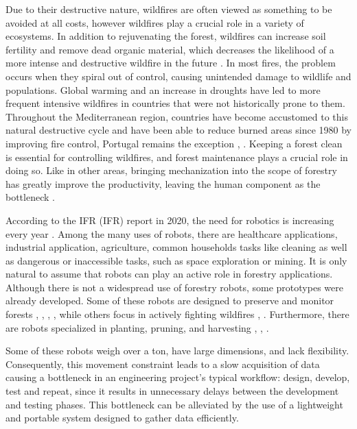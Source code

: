 Due to their destructive nature, wildfires are often viewed as something to be avoided at all costs, however wildfires play a crucial role in a variety of ecosystems. In addition to rejuvenating the forest, wildfires can increase soil fertility and remove dead organic material, which decreases the likelihood of a more intense and destructive wildfire in the future \cite{bond_fires_2017}. In most fires, the problem occurs when they spiral out of control, causing unintended damage to wildlife and populations. Global warming and an increase in droughts have led to more frequent intensive wildfires in countries that were not historically prone to them. Throughout the Mediterranean region, countries have become accustomed to this natural destructive cycle and have been able to reduce burned areas since 1980 by improving fire control, Portugal remains the exception \cite{turco_decreasing_2016}, \cite{european_commission_joint_research_centre_forest_2021}. Keeping a forest clean is essential for controlling wildfires, and forest maintenance plays a crucial role in doing so. Like in other areas, bringing mechanization into the scope of forestry has greatly improve the productivity, leaving the human component as the bottleneck \cite{parker_robotics_2016}.

According to the \acl{IFR} (\acs{IFR}) report in 2020, the need for robotics is increasing every year  \cite{IFR_robot_report_2020}. Among the many uses of robots, there are healthcare applications, industrial application, agriculture, common households tasks like cleaning as well as dangerous or inaccessible tasks, such as space exploration or mining. It is only natural to assume that robots can play an active role in forestry applications. Although there is not a widespread use of forestry robots, some prototypes were already developed.  Some of these robots are designed to preserve and monitor forests \cite{couceiro_semfire_2019}, \cite{jelavic_towards_2021}, \cite{lam_flexible_2011}, \cite{notomista_slothbot_2019}, while others focus in actively fighting wildfires \cite{noauthor_firefighting_2014}  \cite{hose_cartridge}, \cite{hydra}. Furthermore, there are robots specialized in planting, pruning, and harvesting \cite{noauthor_multiscope_nodate}, \cite{molina_aerial_2017}, \cite{zhang_rubber-tapping_2019}.

Some of these robots weigh over a ton, have large dimensions, and lack flexibility. Consequently, this movement constraint leads to a slow acquisition of data causing a bottleneck in an engineering project's typical workflow: design, develop, test and repeat, since it results in unnecessary delays between the development and testing phases. This bottleneck can be alleviated by the use of a lightweight and portable system designed to gather data efficiently.

